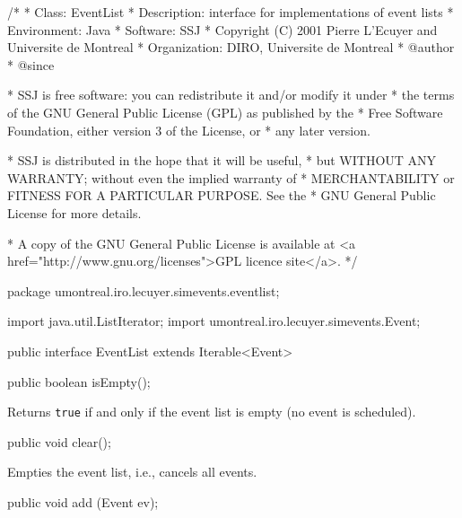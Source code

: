 \begin{code}
\begin{hide}
/*
 * Class:        EventList
 * Description:  interface for implementations of event lists
 * Environment:  Java
 * Software:     SSJ 
 * Copyright (C) 2001  Pierre L'Ecuyer and Universite de Montreal
 * Organization: DIRO, Universite de Montreal
 * @author       
 * @since

 * SSJ is free software: you can redistribute it and/or modify it under
 * the terms of the GNU General Public License (GPL) as published by the
 * Free Software Foundation, either version 3 of the License, or
 * any later version.

 * SSJ is distributed in the hope that it will be useful,
 * but WITHOUT ANY WARRANTY; without even the implied warranty of
 * MERCHANTABILITY or FITNESS FOR A PARTICULAR PURPOSE.  See the
 * GNU General Public License for more details.

 * A copy of the GNU General Public License is available at
   <a href="http://www.gnu.org/licenses">GPL licence site</a>.
 */
\end{hide}
package umontreal.iro.lecuyer.simevents.eventlist; \begin{hide}

import java.util.ListIterator; 
import umontreal.iro.lecuyer.simevents.Event;
\end{hide}

public interface EventList extends Iterable<Event>\begin{hide} {
\end{hide}
 
   public boolean isEmpty();
\end{code}
 \begin{tabb}  Returns {\tt true} if and only if the event list is empty
   (no event is scheduled).
 \end{tabb}
\begin{htmlonly}
\end{htmlonly}
\begin{code}

   public void clear();
\end{code}
 \begin{tabb}  Empties the event list, i.e., cancels all events.
 \end{tabb}
\begin{code}

   public void add (Event ev);
\end{code}
